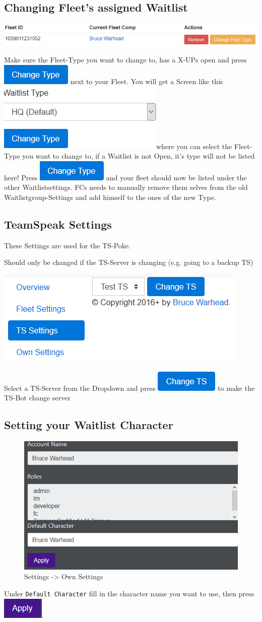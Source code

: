 \documentclass[oneside,a4paper]{article}
\newcommand{\picassignedfleet}{\includegraphics[width=\textwidth]{assigned-fleet.png}}
\newcommand{\picchangetype}{\includegraphics[scale=0.5]{change-type.png}}
\newcommand{\picsettype}{\includegraphics[scale=0.5]{set-type.png}}
\newcommand{\picteamspeaksettings}{\includegraphics{teamspeak-settings.png}}
\newcommand{\picchangets}{\includegraphics[scale=0.5]{change-ts.png}}
\newcommand{\picownsettings}{\includegraphics[width=\textwidth]{own-settings.png}}
\newcommand{\picapply}{\includegraphics[scale=0.5]{apply.png}}
\begin{document}
\subsection{Changing Fleet's assigned Waitlist}
\picassignedfleet



Make sure the Fleet-Type you want to change to, has a X-UPs open and press \picchangetype \xspace next to your Fleet.
You will get a Screen like this \picsettype where you can select the Fleet-Type you want to change to, if a Waitlist is not Open, it's type will not be listed here!
Press \picchangetype \xspace and your fleet should now be listed under the other Waitlistsettings.
FCs needs to manually remove them selves from the old Waitlistgroup-Settings and add himself to the ones of the new Type.

\subsection{TeamSpeak Settings}
These Settings are used for the TS-Poke.

Should only be changed if the TS-Server is changing (e.g. going to a backup TS)


\picteamspeaksettings

Select a TS-Server from the Dropdown and press \picchangets \xspace to make the TS-Bot change server 


\subsection{Setting your Waitlist Character}
\begin{figure}
	\caption{Settings -\textgreater \xspace Own Settings}
	\picownsettings
\end{figure}
Under \texttt{Default Character} fill in the character name you want to use, then press \picapply .
\end{document}
